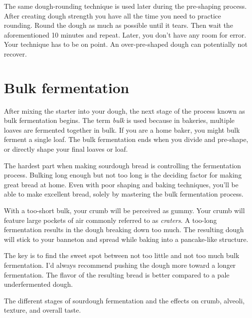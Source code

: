 The same dough-rounding technique is used later during
the pre-shaping process. After creating dough strength you
have all the time you need to practice rounding. Round the dough
as much as possible until it tears. Then wait the aforementioned 10 minutes and repeat.
Later, you don't have any room for error. Your technique has to be on point.
An over-pre-shaped dough can potentially not recover.

\section{Bulk fermentation}%
\label{section:bulk-fermentation}

After mixing the starter into your dough, the next stage of
the process known as bulk fermentation begins. The term
\emph{bulk} is used because in bakeries, multiple loaves are fermented
together in bulk. If you are a home baker, you might bulk
ferment a single loaf. The bulk fermentation ends when you
divide and pre-shape, or directly shape your final loaves or loaf.

The hardest part when making sourdough bread is controlling
the fermentation process. Bulking long enough but not too
long is the deciding factor for making great bread at home.
Even with poor shaping and baking techniques, you'll be able
to make excellent bread, solely by mastering the bulk
fermentation process.

With a too-short bulk, your crumb will be
perceived as gummy. Your crumb will feature large pockets of
air commonly referred to as \emph{craters}. A too-long fermentation
results in the dough breaking down too much. The resulting
dough will stick to your banneton and spread while baking
into a pancake-like structure.

The key is to find the sweet spot between not too little
and not too much bulk fermentation. I'd always recommend pushing
the dough more toward a longer fermentation. The
flavor of the resulting bread is better compared to a pale
underfermented dough.

\begin{table}[!htb]
    \begin{center}
        
        \caption{The different stages of sourdough fermentation and the
        effects on crumb, alveoli, texture, and overall taste.}
    \end{center}
\end{table}

